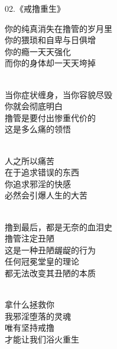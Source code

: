 \documentclass{ctexart}
\begin{document}
\begin{center}
    02.《戒撸重生》\it
    \begin{multicols}{2}
        你的纯真消失在撸管的岁月里 \\ 你的猥琐和自卑与日俱增 \\ 你的瘾一天天强化 \\ 而你的身体却一天天垮掉

        ~\\

        当你症状缠身，当你容貌尽毁 \\ 你就会彻底明白 \\ 撸管是要付出惨重代价的 \\ 这是多么痛的领悟

        ~\\

        人之所以痛苦 \\ 在于追求错误的东西 \\ 你追求邪淫的快感 \\ 必然会引爆人生的大苦

        ~\\

        撸到最后，都是无奈的血泪史 \\ 撸管注定丑陋 \\ 这是一种丑陋龌龊的行为 \\ 任何冠冕堂皇的理论 \\ 都无法改变其丑陋的本质

        ~\\

        拿什么拯救你 \\ 我邪淫堕落的灵魂 \\ 唯有坚持戒撸 \\ 才能让我们浴火重生
    \end{multicols}
\end{center}
\end{document}

